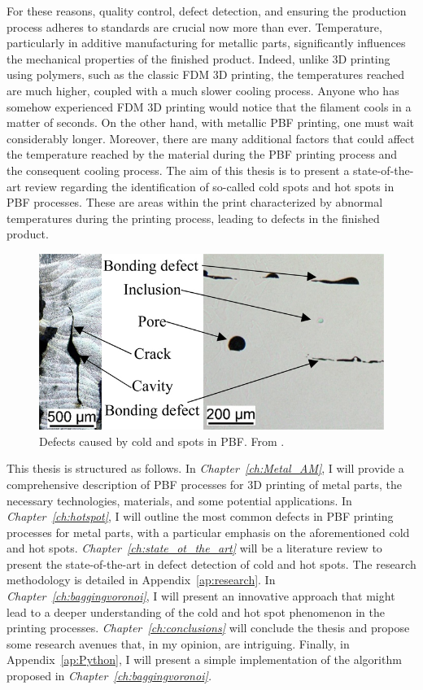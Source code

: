 For these reasons, quality control, defect detection, and ensuring the production process adheres to standards are crucial now more than ever. 
Temperature, particularly in additive manufacturing for metallic parts, significantly influences the mechanical properties of the finished product. Indeed, unlike 3D printing using polymers, such as the classic FDM 3D printing, the temperatures reached are much higher, coupled with a much slower cooling process. Anyone who has somehow experienced FDM 3D printing would notice that the filament cools in a matter of seconds. On the other hand, with metallic PBF printing, one must wait considerably longer. Moreover, there are many additional factors that could affect the temperature reached by the material during the PBF printing process and the consequent cooling process.
The aim of this thesis is to present a state-of-the-art review regarding the identification of so-called cold spots and hot spots in PBF processes. These are areas within the print characterized by abnormal temperatures during the printing process, leading to defects in the finished product.
\begin{figure}[H]
    \centering
    \includegraphics[scale=3.5]{Images/defect.jpeg}
    \caption[Defects in metal AM.]{Defects caused by cold and spots in PBF. From \citeauthor{bernhard_defect_2020}.}
    \label{fig:defect}
\end{figure}

This thesis is structured as follows. In \emph{Chapter~\ref{ch:Metal_AM}}, I will provide a comprehensive description of PBF processes for 3D printing of metal parts, the necessary technologies, materials, and some potential applications. In \emph{Chapter~\ref{ch:hotspot}}, I will outline the most common defects in PBF printing processes for metal parts, with a particular emphasis on the aforementioned cold and hot spots. \emph{Chapter~\ref{ch:state_ot_the_art}} will be a literature review to present the state-of-the-art in defect detection of cold and hot spots. The research methodology is detailed in Appendix~\ref{ap:research}. In \emph{Chapter~\ref{ch:baggingvoronoi}}, I will present an innovative approach that might lead to a deeper understanding of the cold and hot spot phenomenon in the printing processes. \emph{Chapter~\ref{ch:conclusions}} will conclude the thesis and propose some research avenues that, in my opinion, are intriguing. Finally, in Appendix~\ref{ap:Python}, I will present a simple implementation of the algorithm proposed in \emph{Chapter~\ref{ch:baggingvoronoi}.}